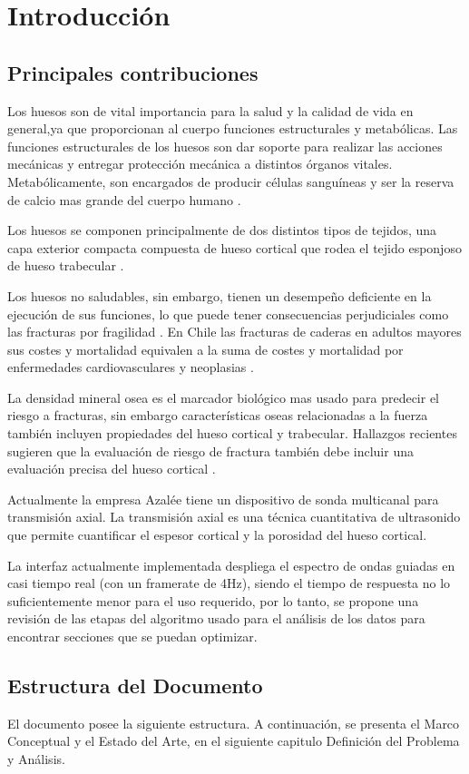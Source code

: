 
\chapter{Introducci\'on}

\section{Principales contribuciones}

Los huesos son de vital importancia para la salud y la calidad de vida en general\cite{US},ya que proporcionan al cuerpo funciones estructurales y metabólicas.
Las funciones estructurales de los huesos son dar soporte para realizar las acciones mecánicas y entregar protección mecánica a distintos órganos vitales.
Metabólicamente, son encargados de producir células sanguíneas y ser la reserva de calcio mas grande del cuerpo humano
\cite{Lorincz2009}.

Los huesos se componen principalmente de dos distintos tipos de tejidos, una capa exterior compacta compuesta de hueso cortical que rodea el tejido esponjoso de hueso trabecular
\cite{Cooper2016}.

Los huesos no saludables, sin embargo, tienen un desempeño deficiente en la ejecución de sus funciones, lo que puede tener consecuencias perjudiciales como las fracturas por fragilidad
\cite{US}.
En Chile las fracturas de caderas  en adultos mayores sus costes y mortalidad equivalen a la suma de costes y mortalidad por enfermedades cardiovasculares y neoplasias
\cite{DINAMARCA-MONTECINOS2015}.

La densidad mineral osea es el marcador biológico mas usado para predecir el riesgo a fracturas, sin embargo características oseas relacionadas a la fuerza también incluyen propiedades del hueso cortical y trabecular.
Hallazgos recientes sugieren que la evaluación de riesgo de fractura también debe incluir una evaluación precisa del hueso cortical
\cite{Bala2015}.

Actualmente la empresa Azalée tiene un dispositivo de sonda multicanal para transmisión axial.
La transmisión axial es una técnica cuantitativa de ultrasonido que permite cuantificar el espesor cortical y la porosidad del hueso cortical.

La interfaz actualmente implementada despliega el espectro de ondas guiadas en casi tiempo real (con un framerate de 4Hz), siendo el tiempo de respuesta no lo suficientemente menor para el uso requerido, por lo tanto, se propone una revisión de las etapas del algoritmo usado para el análisis de los datos para encontrar secciones que se puedan optimizar.

\section{Estructura del Documento}

El documento posee la siguiente estructura. A continuación, se presenta el Marco Conceptual y el Estado del Arte, en el siguiente capitulo Definición del Problema y Análisis.
